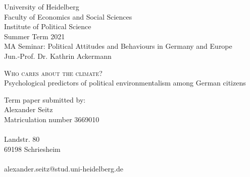 \thispagestyle{empty}
\setcounter{page}{0}

\noindent
University of Heidelberg\\
Faculty of Economics and Social Sciences\\
Institute of Political Science\\
Summer Term 2021\\
MA Seminar: Political Attitudes and Behaviours in Germany and Europe\\
Jun.-Prof. Dr. Kathrin Ackermann\\

\begin{center}

\vspace*{5cm}

\huge\textsc{Who cares about the climate?}\\
\LARGE{Psychological predictors of political environmentalism among German citizens}\\

\vspace*{6.5cm}

\end{center}
Term paper submitted by:\\
Alexander Seitz\\
Matriculation number 3669010\\
\\
Landstr. 80\\
69198 Schriesheim\\
\\
alexander.seitz@stud.uni-heidelberg.de\\

\newpage
